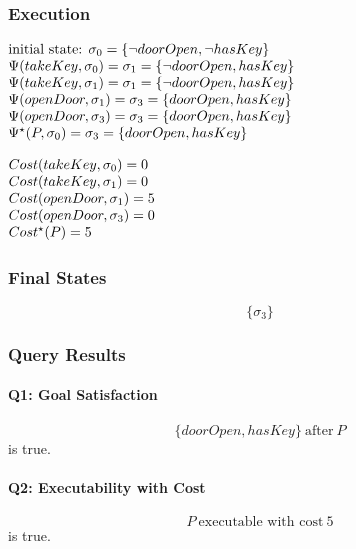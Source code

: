 \documentclass[11pt]{article}
\makeatletter
\newenvironment{centeredleftblock}[1][0.78\textwidth]
{\begin{center}\begin{minipage}{#1}\raggedright}
{\end{minipage}\end{center}}
\newenvironment{statementblock}
{\begin{flushleft}\renewcommand{\arraystretch}{1.1}\(\begin{array}{@{}l@{}}}
{\end{array}\)\end{flushleft}}
\makeatother
\begin{document}
\subsubsection*{Execution}
\begin{centeredleftblock}[0.92\textwidth]
\noindent
\begin{minipage}[t]{0.64\linewidth}
\begin{statementblock}
\text{initial state: } \sigma_0 = \{\neg doorOpen, \neg hasKey\} \\
\Psi(takeKey, \sigma_0) = \sigma_1 = \{\neg doorOpen, hasKey\} \\
\Psi(takeKey, \sigma_1) = \sigma_1 = \{\neg doorOpen, hasKey\} \\
\Psi(openDoor, \sigma_1) = \sigma_3 = \{doorOpen, hasKey\} \\
\Psi(openDoor, \sigma_3) = \sigma_3 = \{doorOpen, hasKey\} \\
\Psi^\star(P, \sigma_0) = \sigma_3 = \{doorOpen, hasKey\}
\end{statementblock}
\end{minipage}
\hfill
\begin{minipage}[t]{0.28\linewidth}
\begin{statementblock}
Cost(takeKey, \sigma_0) = 0 \\
Cost(takeKey, \sigma_1) = 0 \\
Cost(openDoor, \sigma_1) = 5 \\
Cost(openDoor, \sigma_3) = 0 \\
Cost^\star(P) = 5
\end{statementblock}
\end{minipage}
\end{centeredleftblock}

\subsubsection*{Final States}
\[
\{\sigma_3\}
\]


\subsubsection*{Query Results}

\paragraph{Q1: Goal Satisfaction}
\[
\{doorOpen, hasKey\} ~\text{after}~ P
\]
is true.

\paragraph{Q2: Executability with Cost}
\[
P ~\text{executable with cost}~ 5
\]
is true.
\end{document}
